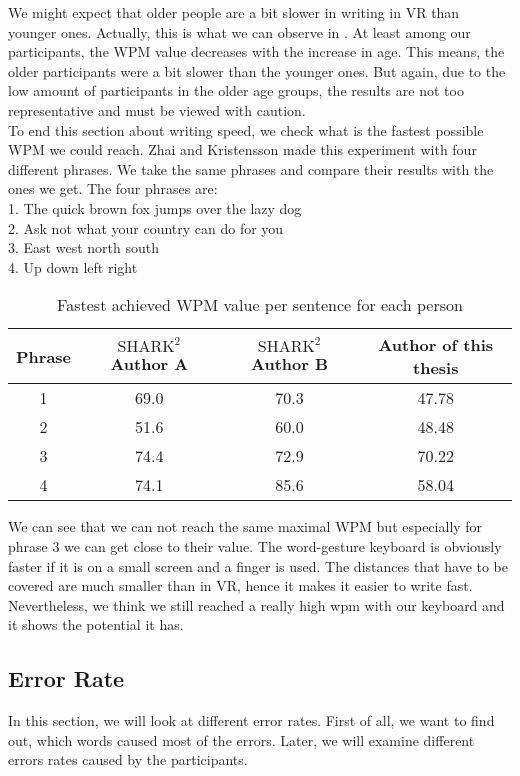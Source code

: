 We might expect that older people are a bit slower in writing in VR than younger ones. Actually, this is what we can observe in . At least among our participants, the WPM value decreases with the increase in age. This means, the older participants were a bit slower than the younger ones. But again, due to the low amount of participants in the older age groups, the results are not too representative and must be viewed with caution.\\

To end this section about writing speed, we check what is the fastest possible WPM we could reach. Zhai and Kristensson \cite{Kristensson2004SHARK2AL} made this experiment with four different phrases. We take the same phrases and compare their results with the ones we get. The four phrases are:\\
1. The quick brown fox jumps over the lazy dog\\
2. Ask not what your country can do for you\\
3. East west north south\\
4. Up down left right\\

\begin{table}[H]
    \centering
    \caption{Fastest achieved WPM value per sentence for each person}
    \begin{tabular}{cccc} \toprule
        Phrase&$\text{SHARK}^2$ Author A&$\text{SHARK}^2$ Author B&Author of this thesis\\ \midrule
        1&69.0&70.3&47.78\\
        2&51.6&60.0&48.48\\
        3&74.4&72.9&70.22\\
        4&74.1&85.6&58.04\\
        \bottomrule
    \end{tabular}
    \label{tab:top speed}
\end{table}
We can see that we can not reach the same maximal WPM but especially for phrase 3 we can get close to their value. The word-gesture keyboard is obviously faster if it is on a small screen and a finger is used. The distances that have to be covered are much smaller than in VR, hence it makes it easier to write fast. Nevertheless, we think we still reached a really high wpm with our keyboard and it shows the potential it has.

\subsection{Error Rate}
In this section, we will look at different error rates. First of all, we want to find out, which words caused most of the errors. Later, we will examine different errors rates caused by the participants.

